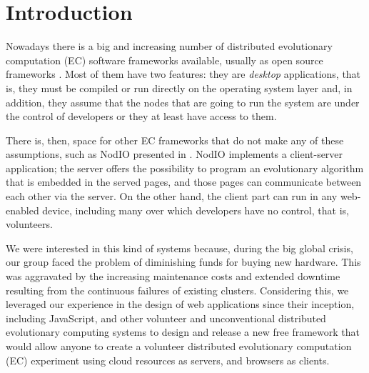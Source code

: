 \documentclass{sig-alternate}
\begin{document}


\section{Introduction}

Nowadays there is a big and increasing number of distributed
evolutionary computation (EC) software frameworks available, usually
as open source frameworks \cite{Parejo12Survey}.  Most of them have
two features: they are {\em desktop} applications, that is, they must
be compiled or run directly on the operating system layer and, in addition,
they assume that the nodes that are going to run the system are under
the control of developers or they at least have access to them.

There is, then, space for other EC frameworks that do not make any of
these assumptions, such as {\sf NodIO} presented in
\cite{2016arXiv160101607Manom}. {\sf NodIO} implements a client-server application; the server offers the possibility to program an
evolutionary algorithm that is embedded in the served pages, and those pages can communicate between each other via the server. On the other hand, the client part can run in any
web-enabled device, including many over which developers have no
control, that is, volunteers.

We were interested in this kind of systems because, during the big
global crisis, our group faced the problem of diminishing funds for
buying new hardware. This was aggravated by the increasing maintenance costs and
extended downtime resulting from the continuous failures of existing
clusters.
Considering this, we leveraged our experience in the design of web
applications since their inception, including JavaScript, and other
volunteer and
unconventional distributed evolutionary computing systems to 
design and release a new free framework that would allow anyone to
create a volunteer distributed evolutionary computation (EC) experiment using cloud resources as
servers, and browsers as clients.
\end{document}
